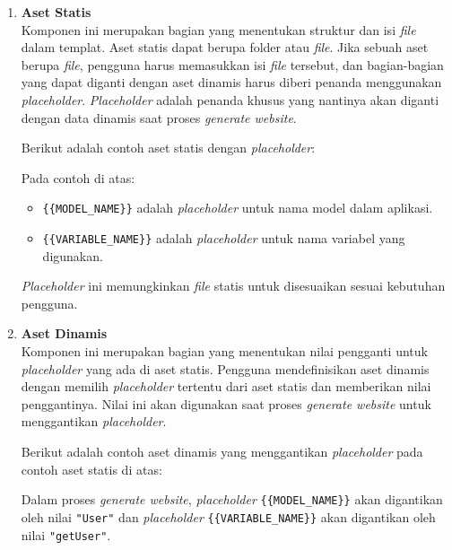\begin{enumerate}[label=\alph*.]
    \item \textbf{Aset Statis}\\
        Komponen ini merupakan bagian yang menentukan struktur dan isi \textit{file} dalam templat. Aset statis dapat berupa folder atau \textit{file}. Jika sebuah aset berupa \textit{file}, pengguna harus memasukkan isi \textit{file} tersebut, dan bagian-bagian yang dapat diganti dengan aset dinamis harus diberi penanda menggunakan \textit{placeholder}. \textit{Placeholder} adalah penanda khusus yang nantinya akan diganti dengan data dinamis saat proses \textit{generate website}.

        Berikut adalah contoh aset statis dengan \textit{placeholder}:
        
        
        Pada contoh di atas:
        \begin{itemize}
            \item \texttt{\{\{MODEL\_NAME\}\}} adalah \textit{placeholder} untuk nama model dalam aplikasi.
            \item \texttt{\{\{VARIABLE\_NAME\}\}} adalah \textit{placeholder} untuk nama variabel yang digunakan.
        \end{itemize}
        \textit{Placeholder} ini memungkinkan \textit{file} statis untuk disesuaikan sesuai kebutuhan pengguna.

    \item \textbf{Aset Dinamis}\\
        Komponen ini merupakan bagian yang menentukan nilai pengganti untuk \textit{placeholder} yang ada di aset statis. Pengguna mendefinisikan aset dinamis dengan memilih \textit{placeholder} tertentu dari aset statis dan memberikan nilai penggantinya. Nilai ini akan digunakan saat proses \textit{generate website} untuk menggantikan \textit{placeholder}.

        Berikut adalah contoh aset dinamis yang menggantikan \textit{placeholder} pada contoh aset statis di atas:
        

        Dalam proses \textit{generate website}, \textit{placeholder} \texttt{\{\{MODEL\_NAME\}\}} akan digantikan oleh nilai \texttt{"User"} dan \textit{placeholder} \texttt{\{\{VARIABLE\_NAME\}\}} akan digantikan oleh nilai \texttt{"getUser"}.
\end{enumerate}
